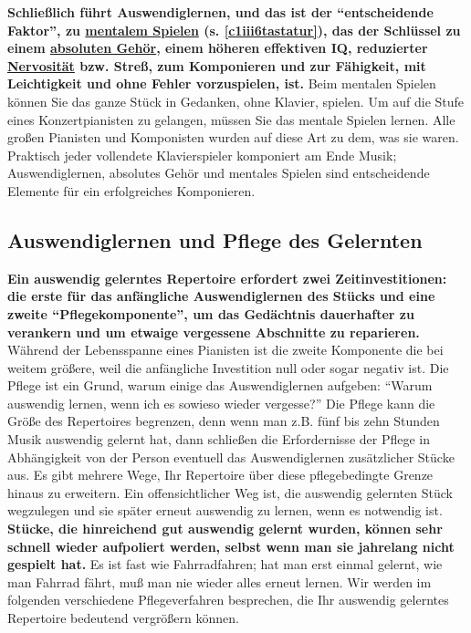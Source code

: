 \textbf{Schließlich führt Auswendiglernen, und das ist der \enquote{entscheidende Faktor}, zu \hyperref[c1iii6tastatur]{mentalem Spielen} (s. \ref*{c1iii6tastatur}), das der Schlüssel zu einem \hyperref[c1iii12]{absoluten Gehör}, einem höheren effektiven IQ, reduzierter \hyperref[c1iii15]{Nervosität} bzw. Streß, zum Komponieren und zur Fähigkeit, mit Leichtigkeit und ohne Fehler vorzuspielen, ist.}
Beim mentalen Spielen können Sie das ganze Stück in Gedanken, ohne Klavier, spielen.
Um auf die Stufe eines Konzertpianisten zu gelangen, müssen Sie das mentale Spielen lernen.
Alle großen Pianisten und Komponisten wurden auf diese Art zu dem, was sie waren.
Praktisch jeder vollendete Klavierspieler komponiert am Ende Musik; Auswendiglernen, absolutes Gehör und mentales Spielen sind entscheidende Elemente für ein erfolgreiches Komponieren.


\subsection{Auswendiglernen und Pflege des Gelernten}
\label{c1iii6c}

\textbf{Ein auswendig gelerntes Repertoire erfordert zwei Zeitinvestitionen: die erste für das anfängliche Auswendiglernen des Stücks und eine zweite \enquote{Pflegekomponente}, um das Gedächtnis dauerhafter zu verankern und um etwaige vergessene Abschnitte zu reparieren.}
Während der Lebensspanne eines Pianisten ist die zweite Komponente die bei weitem größere, weil die anfängliche Investition null oder sogar negativ ist.
Die Pflege ist ein Grund, warum einige das Auswendiglernen aufgeben: \enquote{Warum auswendig lernen, wenn ich es sowieso wieder vergesse?}
Die Pflege kann die Größe des Repertoires begrenzen, denn wenn man z.B. fünf bis zehn Stunden Musik auswendig gelernt hat, dann schließen die Erfordernisse der Pflege in Abhängigkeit von der Person eventuell das Auswendiglernen zusätzlicher Stücke aus.
Es gibt mehrere Wege, Ihr Repertoire über diese pflegebedingte Grenze hinaus zu erweitern.
Ein offensichtlicher Weg ist, die auswendig gelernten Stück wegzulegen und sie später erneut auswendig zu lernen, wenn es notwendig ist.
\textbf{Stücke, die hinreichend gut auswendig gelernt wurden, können sehr schnell wieder aufpoliert werden, selbst wenn man sie jahrelang nicht gespielt hat.}
Es ist fast wie Fahrradfahren; hat man erst einmal gelernt, wie man Fahrrad fährt, muß man nie wieder alles erneut lernen.
Wir werden im folgenden verschiedene Pflegeverfahren besprechen, die Ihr auswendig gelerntes Repertoire bedeutend vergrößern können. 

